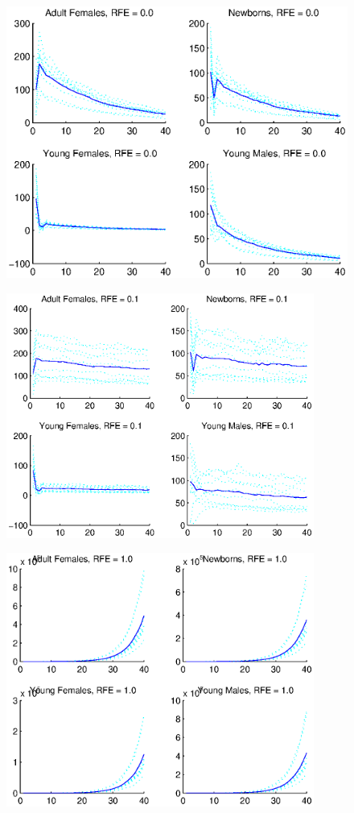 \documentclass[fleqn, letterpaper]{amsart}
\begin{document}
\begin{figure}
\includegraphics[width=\textwidth]{general0}
\end{figure}
\begin{figure}
\includegraphics[width=0.9\textwidth]{rgeneral1}
\end{figure}
\begin{figure}
\includegraphics[width=0.9\textwidth]{rgeneral10}
\end{figure}
\end{document}
